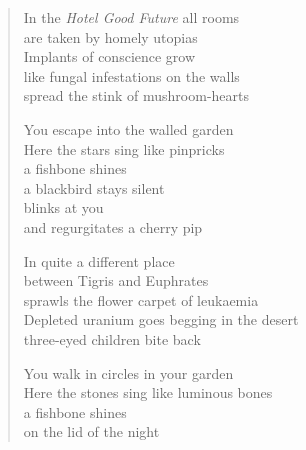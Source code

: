 \begin{verse}
In the \emph{Hotel Good Future} all rooms\\
are taken by homely utopias\\
Implants of conscience grow\\
like fungal infestations on the walls\\
spread the stink of mushroom-hearts

You escape into the walled garden\\
Here the stars sing like pinpricks\\
a fishbone shines\\
a blackbird stays silent\\
blinks at you\\
and regurgitates a cherry pip

In quite a different place\\
between Tigris and Euphrates\\
sprawls the flower carpet of leukaemia\\
Depleted uranium goes begging in the desert\\
three-eyed children bite back

You walk in circles in your garden\\
Here the stones sing like luminous bones\\
a fishbone shines\\
on the lid of the night
\end{verse}

